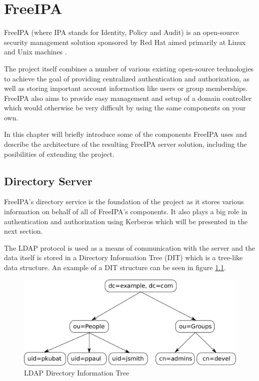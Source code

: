 \chapter{FreeIPA}
\label{chp:freeipa}

FreeIPA (where IPA stands for Identity, Policy and Audit) is an open-source security management solution sponsored by Red Hat aimed primarily at Linux and Unix machines \cite{ipaWeb}.

The project itself combines a number of various existing open-source technologies to achieve the goal of providing centralized authentication and authorization, as well as storing important account information like users or group memberships.
FreeIPA also aims to provide easy management and setup of a domain controller which would otherwise be very difficult by using the same components on your own.

In this chapter will briefly introduce some of the components FreeIPA uses and describe the architecture of the resulting FreeIPA server solution, including the posibilities of extending the project.

\section{Directory Server}
FreeIPA's directory service is the foundation of the project as it stores various information on behalf of all of FreeIPA's components.
It also plays a big role in authentication and authorization using Kerberos which will be presented in the next section.

The LDAP protocol \cite{ldapRFC} is used as a means of communication with the server and the data itself is stored in a Directory Information Tree (DIT) which is a tree-like data structure.
An example of a DIT structure can be seen in figure \ref{fig:dit}.

\begin{figure}[!ht]
    \centering
        \includegraphics[scale=0.6]{fig/ldap-dit}
    \caption{LDAP Directory Information Tree}
    \label{fig:dit}
\end{figure}

